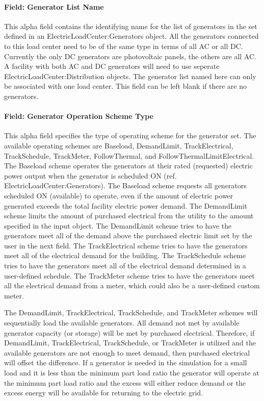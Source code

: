 \paragraph{Field: Generator List Name}\label{field-generator-list-name}

This alpha field contains the identifying name for the list of generators in the set defined in an ElectricLoadCenter:Generators object. All the generators connected to this load center need to be of the same type in terms of all AC or all DC. Currently the only DC generators are photovoltaic panels, the others are all AC. A facility with both AC and DC generators will need to use seperate ElectricLoadCenter:Distribution objects. The generator list named here can only be associated with one load center. This field can be left blank if there are no generators.

\paragraph{Field: Generator Operation Scheme Type}\label{field-generator-operation-scheme-type}

This alpha field specifies the type of operating scheme for the generator set. The available operating schemes are Baseload, DemandLimit, TrackElectrical, TrackSchedule, TrackMeter, FollowThermal, and FollowThermalLimitElectrical. The Baseload scheme operates the generators at their rated (requested) electric power output when the generator is scheduled ON (ref. ElectricLoadCenter:Generators). The Baseload scheme requests all generators scheduled ON (available) to operate, even if the amount of electric power generated exceeds the total facility electric power demand. The DemandLimit scheme limits the amount of purchased electrical from the utility to the amount specified in the input object. The DemandLimit scheme tries to have the generators meet all of the demand above the purchased electric limit set by the user in the next field. The TrackElectrical scheme tries to have the generators meet all of the electrical demand for the building. The TrackSchedule scheme tries to have the generators meet all of the electrical demand determined in a user-defined schedule. The TrackMeter scheme tries to have the generators meet all the electrical demand from a meter, which could also be a user-defined custom meter.

The DemandLimit, TrackElectrical, TrackSchedule, and TrackMeter schemes will sequentially load the available generators. All demand not met by available generator capacity (or storage) will be met by purchased electrical. Therefore, if DemandLimit, TrackElectrical, TrackSchedule, or TrackMeter is utilized and the available generators are not enough to meet demand, then purchased electrical will offset the difference. If a generator is needed in the simulation for a small load and it is less than the minimum part load ratio the generator will operate at the minimum part load ratio and the excess will either reduce demand or the excess energy will be available for returning to the electric grid.

